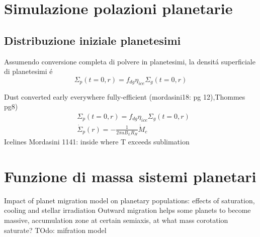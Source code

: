 {\let\clearpage\relax\let\cleardoublepage\relax
\chapter{Simulazione polazioni planetarie}
}

\section{Distribuzione iniziale planetesimi}
Assumendo conversione completa di polvere in planetesimi, la densit\'a superficiale di planetesimi \'e
\begin{equation}
\Sigma_p(t=0,r)=f_{dg}\eta_{ice}\Sigma_g(t=0,r)
\end{equation}

\begin{workout}
Dust converted early everywhere fully-efficient (mordasini18: pg 12),Thommes pg8)
\begin{align*}
&\Sigma_p(t=0,r)=f_{dg}\eta_{ice}\Sigma_g(t=0,r)\\
&\dot{\Sigma}_p(r)=-\frac{1}{2\pi aB_LR_H}\dot{M}_c
\end{align*}
Icelines Mordasini 1141: inside where T exceeds sublimation
\end{workout}

{\let\clearpage\relax\let\cleardoublepage\relax
\chapter{Funzione di massa sistemi planetari}
}

{Impact of planet migration model on planetary populations: effects of saturation, cooling and stellar irradiation}
Outward migration helps some planets to become massive, accumulation zone at certain semiaxis, at what mass corotation saturate?
TOdo: mifration model
